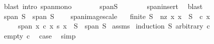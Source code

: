 \begin{isabellebody}
\ {\isacharparenleft}{\kern0pt}blast\ intro{\isacharbang}{\kern0pt}{\isacharcolon}{\kern0pt}\ span{\isacharunderscore}{\kern0pt}mono{\isacharparenright}{\kern0pt}\isanewline
\ \ \isamarkupfalse%
\ \isamarkupfalse%
\ {\isachardoublequoteopen}{\isachardot}{\kern0pt}{\isachardot}{\kern0pt}{\isachardot}{\kern0pt}\ {\isasymsubseteq}\ span{\isacharparenleft}{\kern0pt}S\ {\isacharminus}{\kern0pt}\ {\isacharbraceleft}{\kern0pt}{}{\isacharbraceright}{\kern0pt}{\isacharparenright}{\kern0pt}{\isachardoublequoteclose}\isanewline
\ \ \ \ \isamarkupfalse%
\ span{\isacharunderscore}{\kern0pt}insert{\isacharunderscore}{\kern0pt}{}\ \isamarkupfalse%
\ blast\isanewline
\ \ \isamarkupfalse%
\ \isamarkupfalse%
\ {\isachardoublequoteopen}span\ S\ {\isasymsubseteq}\ span\ {\isacharparenleft}{\kern0pt}S\ {\isacharminus}{\kern0pt}\ {\isacharbraceleft}{\kern0pt}{}{\isacharbraceright}{\kern0pt}{\isacharparenright}{\kern0pt}{\isachardoublequoteclose}\ \isacommand{{\isachardot}{\kern0pt}}\isamarkupfalse%
\isanewline
{}\isamarkupfalse%
%
\endisatagproof
{\isafoldproof}%
%
\isadelimproof
\isanewline
%
\endisadelimproof
\isanewline
{}\isamarkupfalse%
\ span{\isacharunderscore}{\kern0pt}image{\isacharunderscore}{\kern0pt}scale{\isacharcolon}{\kern0pt}\isanewline
\ \ \ {\isachardoublequoteopen}finite\ S{\isachardoublequoteclose}\ \ nz{\isacharcolon}{\kern0pt}\ {\isachardoublequoteopen}{\isasymAnd}x{\isachardot}{\kern0pt}\ x\ {\isasymin}\ S\ {\isasymLongrightarrow}\ c\ x\ {\isasymnoteq}\ {}{\isachardoublequoteclose}\isanewline
\ \ \ \ \ {\isachardoublequoteopen}span\ {\isacharparenleft}{\kern0pt}{\isacharparenleft}{\kern0pt}{\isasymlambda}x{\isachardot}{\kern0pt}\ c\ x\ {\isacharasterisk}{\kern0pt}s\ x{\isacharparenright}{\kern0pt}\ {\isacharbackquote}{\kern0pt}\ S{\isacharparenright}{\kern0pt}\ {\isacharequal}{\kern0pt}\ span\ S{\isachardoublequoteclose}\isanewline
%
\isadelimproof
%
\endisadelimproof
%
\isatagproof
{}\isamarkupfalse%
\ assms\isanewline
{}\isamarkupfalse%
\ {\isacharparenleft}{\kern0pt}induction\ S\ arbitrary{\isacharcolon}{\kern0pt}\ c{\isacharparenright}{\kern0pt}\isanewline
\ \ \isamarkupfalse%
\ {\isacharparenleft}{\kern0pt}empty\ c{\isacharparenright}{\kern0pt}\ \isamarkupfalse%
\ {\isacharquery}{\kern0pt}case\ \isamarkupfalse%
\ simp\isanewline
{}\isamarkupfalse%

\end{isabellebody}
